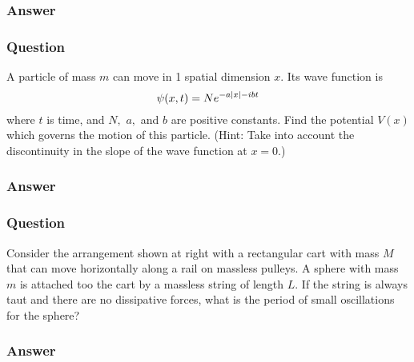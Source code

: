 \subsubsection{Answer}



\subsubsection{Question}
A particle of mass $m$ can move in 1 spatial dimension $x$. Its wave function is
\begin{equation*}
	\psi(x,t) = N e^{-a\abs{x}-ibt}
\end{equation*}
where $t$ is time, and $N,$ $a,$ and $b$ are positive constants. Find the potential $V(x)$ which governs the motion of this particle. (Hint: Take into account the discontinuity in the slope of the wave function at $x = 0$.)
\subsubsection{Answer}

\subsubsection{Question}
Consider the arrangement shown at right with a rectangular cart with mass $M$ that can move horizontally along a rail on massless pulleys. A sphere with mass $m$ is attached too the cart by a massless string of length $L$. If the string is always taut and there are no dissipative forces, what is the period of small oscillations for the sphere?
\subsubsection{Answer}



